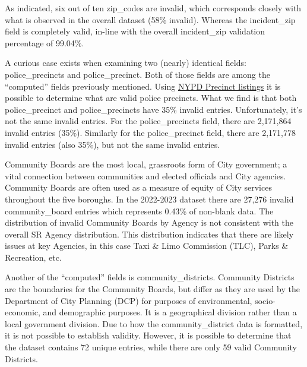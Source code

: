 \documentclass[12pt, titlepage]{article}
\begin{document}
As indicated, six out of ten zip\_codes are invalid, which corresponds closely 
with what is observed in the overall dataset (58\% invalid). Whereas 
the incident\_zip field is completely valid, in-line with the 
overall incident\_zip validation percentage of 99.04\%.


\label{sec:police-precincts}
A curious case exists when examining two (nearly) identical 
fields: police\_precincts and police\_precinct. Both of those fields 
are among the ``computed'' fields previously mentioned. Using 
\href{https://www.nyc.gov/site/nypd/bureaus/patrol/precincts-landing.page}
{NYPD Precinct listings} it is possible to determine what are valid 
police precincts. What we find is that both police\_precinct 
and police\_precincts  have  35\% invalid entries. Unfortunately, 
it's not the same invalid entries. For the police\_precincts field, 
there are 2,171,864 invalid entries (35\%). Similarly for the 
police\_precinct field, there are 2,171,778 invalid entries 
(also 35\%), but not the same invalid entries. 

\label{sec:communityboards}
Community Boards are the most local, grassroots form of 
City government; a vital connection between communities and 
elected officials and City agencies. Community Boards are often
used as a measure of equity of City services throughout the five 
boroughs. In the 2022-2023 dataset there are 27,276 invalid community\_board 
entries which represents 0.43\% of non-blank data. The distribution 
of invalid Community Boards by Agency is not consistent with 
the overall SR Agency distribution. This distribution indicates that 
there are likely issues at key Agencies, in this case Taxi \& Limo 
Commission (TLC), Parks \& Recreation, etc. 

\label{sec:communitydistrict}
Another of the ``computed'' fields is community\_districts. Community Districts 
are the boundaries for the Community Boards, but differ as they
are used by the Department of City Planning (DCP) for purposes 
of environmental, socio-economic, and demographic 
purposes. It is a geographical division rather than a local 
government division. Due to how the community\_district data 
is formatted, it is not possible to establish validity. However, 
it is possible to determine that the dataset contains 72 unique 
entries, while there are only 59 valid Community Districts. 
	
\end{document}
